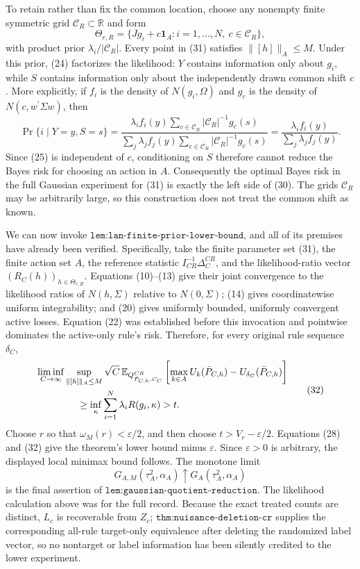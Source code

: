 To retain rather than fix the common location, choose any nonempty finite symmetric grid \(\mathcal C_R\subset\mathbb R\) and form
\[
 \Theta_{r,R}=\{Jg_i+c\mathbf1_A:
                  i=1,\ldots,N,\ c\in\mathcal C_R\},           \tag{31}
\]
with product prior \(\lambda_i/|\mathcal C_R|\).  Every point in (31) satisfies \(\lVert[h]\rVert_A\leq M\).  Under this prior, (24) factorizes the likelihood: \(Y\) contains information only about \(g_i\), while \(S\) contains information only about the independently drawn common shift \(c\).  More explicitly, if \(f_i\) is the density of \(N(g_i,\Omega)\) and \(g_c\) is the density of \(N(c,w^{\prime}\Sigma w)\), then
\[
 \Pr\{i\mid Y=y,S=s\}
 =\frac{\lambda_i f_i(y)\sum_{c\in\mathcal C_R}|\mathcal C_R|^{-1}g_c(s)}
        {\sum_j\lambda_j f_j(y)\sum_{c\in\mathcal C_R}|\mathcal C_R|^{-1}g_c(s)}
 =\frac{\lambda_i f_i(y)}{\sum_j\lambda_j f_j(y)}.
\]
Since (25) is independent of \(c\), conditioning on \(S\) therefore cannot reduce the Bayes risk for choosing an action in \(A\).  Consequently the optimal Bayes risk in the full Gaussian experiment for (31) is exactly the left side of (30).  The grids \(\mathcal C_R\) may be arbitrarily large, so this construction does not treat the common shift as known.

We can now invoke \(\texttt{lem:lan-finite-prior-lower-bound}\), and all of its premises have already been verified.  Specifically, take the finite parameter set (31), the finite action set \(A\), the reference statistic \(I_{CR}^{-1}\Delta_C^{CR}\), and the likelihood-ratio vector \((R_C(h))_{h\in\Theta_{r,R}}\).  Equations (10)--(13) give their joint convergence to the likelihood ratios of \(N(h,\Sigma)\) relative to \(N(0,\Sigma)\); (14) gives coordinatewise uniform integrability; and (20) gives uniformly bounded, uniformly convergent active losses.  Equation (22) was established before this invocation and pointwise dominates the active-only rule's risk.  Therefore, for every original rule sequence \(\delta_C\),
\[
 \begin{aligned}
 &\liminf_{C\to\infty}\sup_{\lVert[h]\rVert_A\leq M}
 \sqrt C\,\mathbb E_{Q^{CR}_{\bar P_{C,h},C_C}}
 \left[\max_{k\in A}U_k(\bar P_{C,h})
       -U_{\delta_C}(\bar P_{C,h})\right]\\
 &\hspace{15mm}\geq
 \inf_\kappa\sum_{i=1}^N\lambda_iR(g_i,\kappa)>t.
 \end{aligned}                                                   \tag{32}
\]
Choose \(r\) so that \(\omega_M(r)<\varepsilon/2\), and then choose
\(t>V_r-\varepsilon/2\).  Equations (28) and (32) give the theorem's lower bound minus \(\varepsilon\).  Since \(\varepsilon>0\) is arbitrary, the displayed local minimax bound follows.  The monotone limit
\[
 G_{A,M}(\tau_A^2,\alpha_A)\uparrow
 G_A(\tau_A^2,\alpha_A)
\]
is the final assertion of \(\texttt{lem:gaussian-quotient-reduction}\).  The likelihood calculation above was for the full record.  Because the exact treated counts are distinct, \(L_c\) is recoverable from \(Z_c\); \(\texttt{thm:nuisance-deletion-cr}\) supplies the corresponding all-rule target-only equivalence after deleting the randomized label vector, so no nontarget or label information has been silently credited to the lower experiment.

